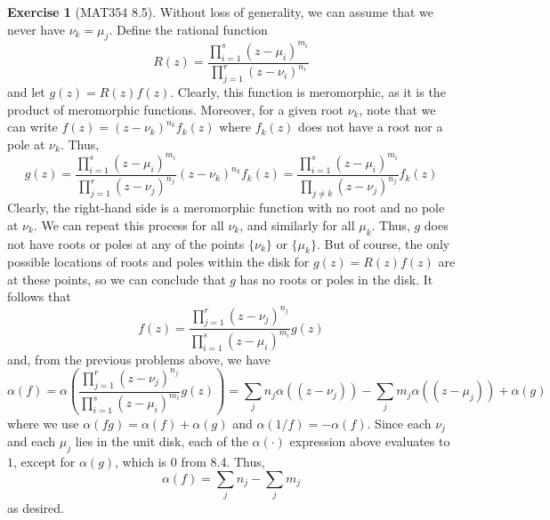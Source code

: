 \documentclass[aps,pra,showpacs,notitlepage,onecolumn,superscriptaddress,nofootinbib]{revtex4-1}
\theoremstyle{definition}
\newtheorem{exercise}{Exercise}[section]
\begin{document}
\begin{exercise}[MAT354 8.5]
  Without loss of generality, we can assume that we never have $\nu_k = \mu_j$. Define the rational function
  \begin{equation}
    R(z) = \frac{\prod_{i = 1}^{s} (z - \mu_i)^{m_i}}{\prod_{j = 1}^{r} (z - \nu_i)^{n_i}}
  \end{equation}
  and let $g(z) = R(z) f(z)$. Clearly, this function is meromorphic, as it is the product of meromorphic functions. Moreover, for a given root $\nu_k$, note that
  we can write $f(z) = (z - \nu_k)^{n_k} f_k(z)$ where $f_k(z)$ does not have a root nor a pole at $\nu_k$. Thus,
  \begin{equation}
    g(z) = \frac{\prod_{i = 1}^{s} (z - \mu_i)^{m_i}}{\prod_{j = 1}^{r} (z - \nu_j)^{n_j}} (z - \nu_k)^{n_k} f_k(z) = \frac{\prod_{i = 1}^{s} (z - \mu_i)^{m_i}}{\prod_{j \neq k} (z - \nu_j)^{n_j}} f_k(z)
  \end{equation}
  Clearly, the right-hand side is a meromorphic function with no root and no pole at $\nu_k$. We can repeat this process for all $\nu_k$, and similarly for all $\mu_k$. Thus, $g$
  does not have roots or poles at any of the points $\{\nu_k\}$ or $\{\mu_k\}$. But of course, the only possible locations of roots and poles within the disk for $g(z) = R(z) f(z)$ are at these points,
  so we can conclude that $g$ has no roots or poles in the disk. It follows that
  \begin{equation}
    f(z) = \frac{\prod_{j = 1}^{r} (z - \nu_j)^{n_j}}{\prod_{i = 1}^{s} (z - \mu_i)^{m_i}} g(z)
  \end{equation}
  and, from the previous problems above, we have
  \begin{equation}
    \alpha(f) = \alpha \left( \frac{\prod_{j = 1}^{r} (z - \nu_j)^{n_j}}{\prod_{i = 1}^{s} (z - \mu_i)^{m_i}} g(z) \right) = \displaystyle\sum_{j} n_j \alpha\left((z - \nu_j)\right) - \displaystyle\sum_{j} m_j \alpha\left((z - \mu_j) \right) + \alpha(g)
  \end{equation}
  where we use $\alpha(fg) = \alpha(f) + \alpha(g)$ and $\alpha(1/f) = -\alpha(f)$. Since each $\nu_j$ and each $\mu_j$ lies in the unit disk, each of the $\alpha(\cdot)$ expression above evaluates to $1$, except for $\alpha(g)$, which is $0$ from 8.4.
  Thus,
  \begin{equation}
    \alpha(f) = \displaystyle\sum_{j} n_j - \displaystyle\sum_{j} m_j
  \end{equation}
  as desired.
  \end{exercise}
\end{document}

